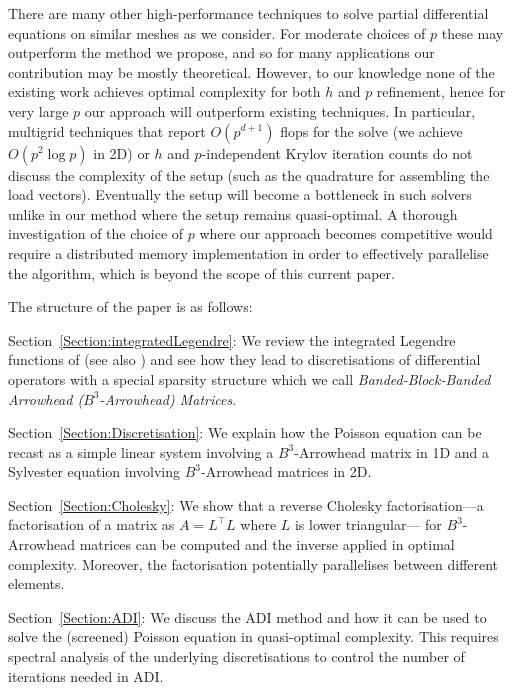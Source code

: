 \documentclass[hidelinks,onefignum,onetabnum]{siamart220329}
\def\secref#1{Section~\ref{Section:#1}}
\begin{document}
\begin{remark}There are many other high-performance techniques to solve partial differential equations on similar meshes as we consider.
For moderate choices of $p$ these may outperform the method we propose, and so for many applications our contribution may be mostly theoretical. However, to our knowledge none of the existing work achieves optimal complexity for both $h$ and $p$ refinement, hence for very large $p$ our approach will outperform existing techniques. In particular, multigrid techniques that report $O(p^{d+1})$ flops for the solve \cite{Brubeck2022} (we achieve $O(p^2 \log p)$ in 2D) or $h$ and $p$-independent Krylov iteration counts \cite{schoberl2008} do not discuss the complexity of the setup (such as the quadrature for assembling the load vectors). Eventually the setup will become a bottleneck in such solvers unlike in our method where the setup remains quasi-optimal. A thorough investigation of the choice of $p$ where our approach becomes competitive would require a distributed memory implementation in order to  effectively parallelise the algorithm, which is beyond the scope of this current paper.
\end{remark}

 

\bigskip

The structure of the paper is as follows:

\secref{integratedLegendre}: We review the integrated Legendre functions of \cite{babuvska1991efficient} (see also \cite[Ch.~3.1.4]{Schwab1998}) and see how they lead to discretisations of  differential operators with a special sparsity structure which we call  {\it Banded-Block-Banded Arrowhead  ($B^3$-Arrowhead) Matrices}.

\secref{Discretisation}: We explain how the Poisson equation can be recast as a simple linear system involving a $B^3$-Arrowhead matrix in 1D and a Sylvester equation involving $B^3$-Arrowhead matrices in 2D. 

\secref{Cholesky}: We show that a reverse Cholesky factorisation---a factorisation of a matrix as $A = L^\top L$ where $L$ is lower triangular--- for $B^3$-Arrowhead matrices can be computed and the inverse applied in optimal complexity. Moreover, the factorisation { potentially } parallelises between different elements. 

\secref{ADI}: We discuss the ADI method and how it can be used to solve the (screened) Poisson equation in quasi-optimal complexity.  This requires spectral analysis of the underlying discretisations to control the number of iterations needed in ADI.
\end{document}
